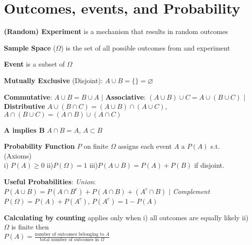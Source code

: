 \documentclass[5pt]{article}
\begin{document}
\section{Outcomes, events, and Probability}
\begin{definition}
\textbf{(Random) Experiment} is a mechanism that results in random outcomes
\end{definition}

\begin{definition}
\textbf{Sample Space} ($\Omega$) is the set of all possible outcomes from and experiment
\end{definition}

\begin{definition}
\textbf{Event} is a subset of $\Omega$
\end{definition}

\begin{definition}
\textbf{Mutually Exclusive} (Disjoint): $A\cup B = \{\} =\varnothing$
\end{definition}

\begin{definition}
\textbf{Commutative}: $A\cup B = B \cup A$ $\vert$ \textbf{Associative}: $(A\cup B) \cup C = A \cup (B \cup C)$ $\vert$ \\
\textbf{Distributive} $A\cup (B\cap C) = (A\cup B)\cap (A\cup C)$, $A\cap (B\cup C) = (A\cap B)\cup (A\cap C)$
\end{definition}

\begin{definition}
\textbf{A implies B} $A\cap B = A$, $A\subset B$
\end{definition}

\begin{definition}
\textbf{Probability Function} $P$ on finite $\Omega$ assigns each event $A$ a $P(A)$ s.t. (Axioms) \\
i) $P(A) \geq 0$ ii)$P(\Omega) = 1$ iii)$P(A\cup B) = P(A)+P(B)$ if disjoint.
\end{definition}

\begin{definition}
\textbf{Useful Probabilities}: \emph{Union}: $P(A\cup B) = P(A\cap B^c) + P(A\cap B) + (A^c \cap B)$ $\vert$ \emph{Complement}\\
 $P(\Omega) = P(A) + P(A^c)$, $P(A^c) = 1 - P(A)$
\end{definition}

\begin{definition}
\textbf{Calculating by counting} applies only when i) all outcomes are equally likely ii) $\Omega$ is finite then \\
$P(A) = \frac{\text{number of outcomes belonging to }A}{\text{total number of outcomes in }\Omega}$
\end{definition}
\end{document}
